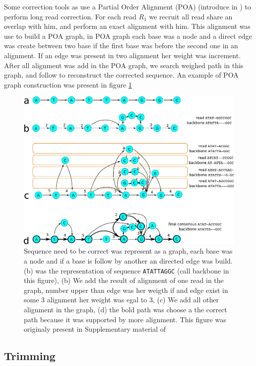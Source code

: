 \documentclass[main]{subfiles}
\begin{document}
Some correction tools as  use a Partial Order Alignment (POA) (introduce in \cite{poa}) to perform long read correction. For each read \texttt{$R_1$} we recruit all read share an overlap with him, and perform an exact alignment with him. This alignment was use to build a POA graph, in POA graph each base was a node and a direct edge was create between two base if the first base was before the second one in an alignment. If an edge was present in two alignment her weight was increment. After all alignment was add in the POA graph, we search weighed path in this graph, and follow to reconstruct the corrected sequence. An example of POA graph construction was present in figure \ref{sota:fig:canu:correction}

\begin{figure}[ht]
    \centering
    \includegraphics[width=\textwidth]{state_of_the_art/images/POA_explain.pdf}
    \caption{Sequence need to be correct was represent as a graph, each base was a node and if a base is follow by another an directed edge was build. (b) was the representation of sequence \texttt{ATATTAGGC} (call backbone in this figure), (b) We add the result of alignment of one read in the graph, number upper than edge was her weigth if and edge exist in some 3 alignment her weight was egal to 3, (c) We add all other alignment in the graph, (d) the bold path was choose a the correct path because it was supported by more alignment. This figure was originaly present in Supplementary material of \hgap \cite{hgap}}
    \label{sota:fig:canu:correction}
\end{figure}

\subsection{Trimming}
\end{document}
